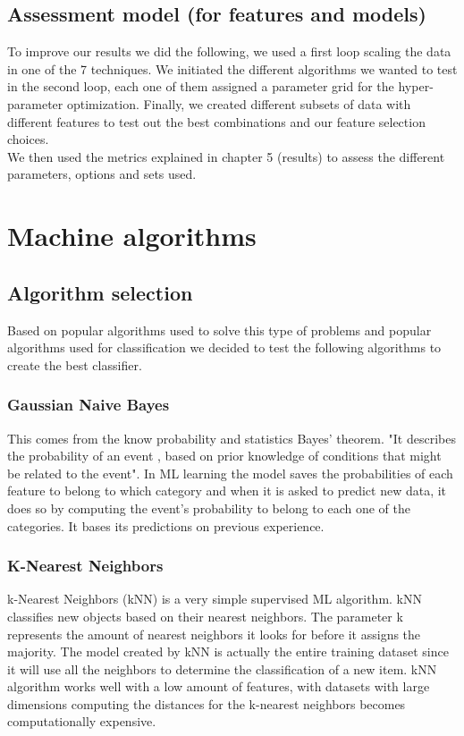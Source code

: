 \subsection{Assessment model (for features and models)}
To improve our results we did the following, we used a first loop scaling the data in one of the 7 techniques. We initiated the different algorithms we wanted to test in the second loop, each one of them assigned a parameter grid for the hyper-parameter optimization. Finally, we created different subsets of data with different features to test out the best combinations and our feature selection choices.\\
We then used the metrics explained in chapter 5 (results) to assess the different parameters, options and sets used.

\section{Machine algorithms}
\subsection{Algorithm selection}
Based on popular algorithms used to solve this type of problems and popular algorithms used for classification we decided to test the following algorithms to create the best classifier.
\subsubsection{Gaussian Naive Bayes}
This comes from the know probability and statistics Bayes' theorem. "It describes the probability of an event , based on prior knowledge of conditions that might be related to the event"\cite{bayes}. In ML learning the model saves the probabilities of each feature to belong to which category and when it is asked to predict new data, it does so by computing the event's probability to belong to each one of the categories. It bases its predictions on previous experience.

\subsubsection{K-Nearest Neighbors}
k-Nearest Neighbors (kNN) is a very simple supervised ML algorithm. kNN classifies new objects based on their nearest neighbors. The parameter k represents the amount of nearest neighbors it looks for before it assigns the majority. The model created by kNN is actually the entire training dataset since it will use all the neighbors to determine the classification of a new item. kNN algorithm works well with a low amount of features, with datasets with large dimensions computing the distances for the k-nearest neighbors becomes computationally expensive.

